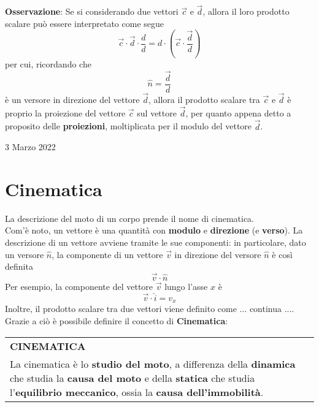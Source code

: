 \documentclass[a4paper]{extarticle}
\renewcommand\arraystretch{}
\begin{document}
\vspace{1em}
\noindent
\textbf{Osservazione}: Se si considerando due vettori $\vec{c}$ e $\vec{d}$, allora il loro prodotto scalare può essere interpretato come segue
\[\vec{c} \cdot \vec{d} \cdot \frac{d}{d} = d \cdot \left(\vec{c} \cdot \frac{\vec{d}}{d}\right)\]
per cui, ricordando che
\[\hat{n} = \frac{\vec{d}}{d}\]
è un versore in direzione del vettore $\vec{d}$, allora il prodotto scalare tra $\vec{c}$ e $\vec{d}$ è proprio la proiezione del vettore $\vec{c}$ sul vettore $\vec{d}$, per quanto appena detto a proposito delle \textbf{proiezioni}, moltiplicata per il modulo del vettore $\vec{d}$.

\newpage
\noindent
\begin{center}
  3 Marzo 2022
\end{center}

\vspace{1em}
\section{Cinematica}
La descrizione del moto di un corpo prende il nome di cinematica.\\ Com'è noto, un vettore è una quantità con \textbf{modulo} e \textbf{direzione} (e \textbf{verso}). La descrizione di un vettore avviene tramite le sue componenti: in particolare, dato un versore $\hat{n}$, la componente di un vettore $\vec{v}$ in direzione del versore $\hat{n}$ è così definita
\[\vec{v} \cdot \hat{n}\]
Per esempio, la componente del vettore $\vec{v}$ lungo l'asse $x$ è
\[\vec{v} \cdot \hat{i} = v_x\]
Inoltre, il prodotto scalare tra due vettori viene definito come ... continua ....
Grazie a ciò è possibile definire il concetto di \textbf{Cinematica}:

\vspace{1em}
\setlength{\tabcolsep}{14pt}
\renewcommand{\arraystretch}{2}
\noindent
\begin{tabularx}{\textwidth}{@{}|P|@{}}
    \hline
    {\textbf{CINEMATICA}}\\
    \parbox{\linewidth}{La cinematica è lo \textbf{studio del moto}, a differenza della \textbf{dinamica} che studia la \textbf{causa del moto} e della \textbf{statica} che studia l'\textbf{equilibrio meccanico}, ossia la \textbf{causa dell'immobilità}.
    \vspace{3mm}}\\
    \hline
\end{tabularx}
\end{document}
